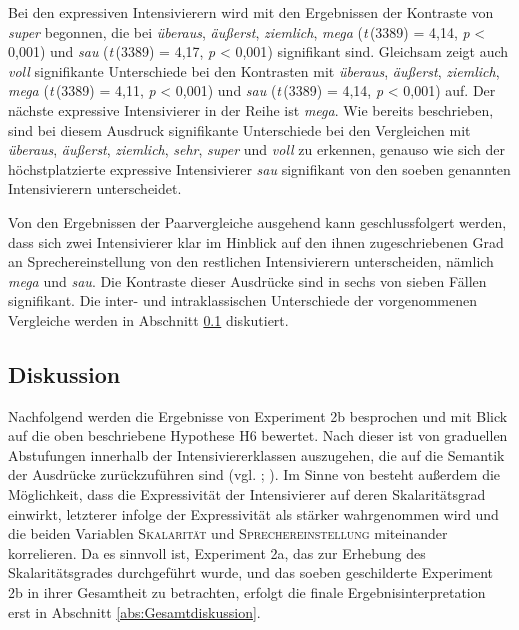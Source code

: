Bei den expressiven Intensivierern wird mit den Ergebnissen der Kontraste von \textit{super} begonnen, die bei \textit{überaus}, \textit{äußerst}, \textit{ziemlich}, \textit{mega} ({\textit{t}\,(3389) = 4,14}, {\textit{p} < 0,001})  und \textit{sau} ({\textit{t}\,(3389) = 4,17}, {\textit{p} < 0,001}) signifikant sind. Gleichsam zeigt auch \textit{voll} signifikante Unterschiede bei den Kontrasten mit \textit{überaus}, \textit{äußerst}, \textit{ziemlich}, \textit{mega} ({\textit{t}\,(3389) = 4,11}, {\textit{p} < 0,001}) und \textit{sau} ({\textit{t}\,(3389) = 4,14}, {\textit{p} < 0,001}) auf. Der nächste expressive Intensivierer in der Reihe ist \textit{mega}. Wie bereits beschrieben, sind bei diesem Ausdruck signifikante Unterschiede bei den Vergleichen mit \textit{überaus}, \textit{äußerst}, \textit{ziemlich}, \textit{sehr}, \textit{super} und \textit{voll} zu erkennen, genauso wie sich der höchstplatzierte expressive Intensivierer \textit{sau} signifikant von den soeben genannten Intensivierern unterscheidet.


Von den Ergebnissen der Paarvergleiche ausgehend kann geschlussfolgert werden, dass sich zwei Intensivierer klar im Hinblick auf den ihnen zugeschriebenen Grad an Sprechereinstellung von den restlichen Intensivierern unterscheiden, nämlich \textit{mega} und \textit{sau}. Die Kontraste dieser Ausdrücke sind in sechs von sieben Fällen signifikant. Die inter- und intraklassischen Unterschiede der vorgenommenen Vergleiche werden in Abschnitt \ref{abs:Diskussion2} diskutiert.








%
\subsection{Diskussion}\label{abs:Diskussion2}
Nachfolgend werden die Ergebnisse von Experiment 2b besprochen und mit Blick auf die oben beschriebene Hypothese  H6 bewertet. Nach dieser ist von graduellen Abstufungen innerhalb der Intensiviererklassen auszugehen, die auf die Semantik der Ausdrücke zurückzuführen sind (vgl. {\citealt[87]{Biedermann.1969}}; \citealt[408]{Breindl.2007}). Im Sinne von \citet[133]{Gutzmann.2019a} besteht außerdem die Möglichkeit, dass die Expressivität der Intensivierer auf deren Skalaritätsgrad einwirkt, letzterer infolge der Expressivität als stärker wahrgenommen wird und die beiden Variablen \textsc{Skalarität} und \textsc{Sprechereinstellung} miteinander korrelieren. Da es sinnvoll ist, {Experiment 2a}, das zur Erhebung des Skalaritätsgrades durchgeführt wurde, und das soeben geschilderte Experiment 2b in ihrer Gesamtheit zu betrachten, erfolgt die finale Ergebnisinterpretation erst in Abschnitt \ref{abs:Gesamtdiskussion}.


